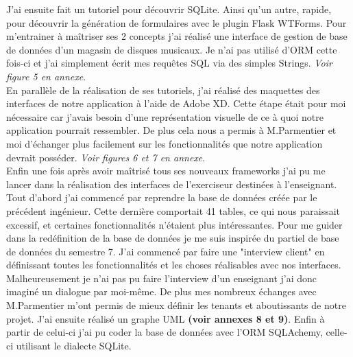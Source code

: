 \documentclass[12pt]{article}
\begin{document}
J’ai ensuite fait un tutoriel pour découvrir SQLite. Ainsi qu’un autre, rapide, pour découvrir la génération de formulaires avec le plugin Flask WTForms. Pour m’entrainer à maîtriser ses 2 concepts j’ai réalisé une interface de gestion de base de données d’un magasin de disques musicaux. Je n’ai pas utilisé d’ORM cette fois-ci et j’ai simplement écrit mes requêtes SQL via des simples Strings. \textit{Voir figure 5 en annexe}. \\

En parallèle de la réalisation de ses tutoriels, j’ai réalisé des maquettes des interfaces de notre application à l’aide de Adobe XD. Cette étape était pour moi nécessaire car j’avais besoin d’une représentation visuelle de ce à quoi notre application pourrait ressembler. De plus cela nous a permis à M.Parmentier et moi d’échanger plus facilement sur les fonctionnalités que notre application devrait posséder.   \textit{Voir figures 6 et 7 en annexe}. \\
 
Enfin une fois après avoir maîtrisé tous ses nouveaux frameworks j’ai pu me lancer dans la réalisation des interfaces de l’exerciseur destinées à l’enseignant. \\

Tout d’abord j’ai commencé par reprendre la base de données créée par le précédent ingénieur. Cette dernière comportait 41 tables, ce qui nous paraissait excessif, et certaines fonctionnalités n'étaient plus intéressantes. Pour me guider dans la redéfinition de la base de données je me suis inspirée du partiel de base de données du semestre 7. J’ai commencé par faire une "interview client" en définissant toutes les fonctionnalités et les choses réalisables avec nos interfaces. Malheureusement je n’ai pas pu faire l’interview d’un enseignant j’ai donc imaginé un dialogue par moi-même. De plus mes nombreux échanges avec M.Parmentier m’ont permis de mieux définir les tenants et aboutissants de notre projet. J’ai ensuite réalisé un graphe UML \textbf{(voir annexes 8 et 9)}. Enfin à partir de celui-ci j’ai pu coder la base de données avec l’ORM SQLAchemy, celle-ci utilisant le dialecte SQLite. \\
\end{document}
